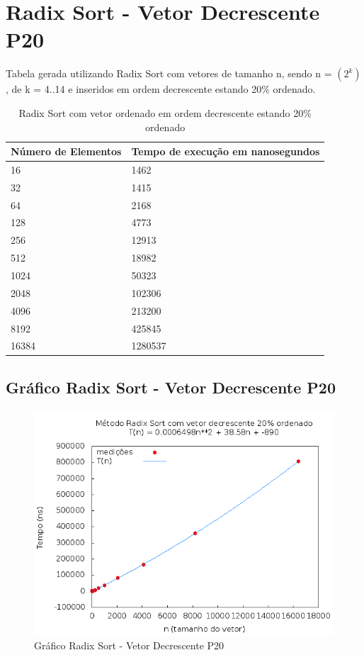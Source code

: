 \documentclass[12pt,a4paper,twoside]{report}
\begin{document}
\section{Radix Sort - Vetor Decrescente P20}
Tabela gerada utilizando Radix Sort com vetores de tamanho n, sendo n = $(2^k)$, de k = 4..14 e inseridos em ordem decrescente estando 20\% ordenado.
\begin{table}[H]
\centering
\caption{Radix Sort com vetor ordenado em ordem decrescente estando 20\% ordenado}
\label{my-label}
\begin{tabular}{|l|l|}
\hline
\multicolumn{1}{|c|}{\textbf{Número de Elementos}} & \multicolumn{1}{c|}{\textbf{Tempo de execução em nanosegundos}} \\ \hline
16 & 1462 \\ \hline
32 & 1415 \\ \hline
64 & 2168 \\ \hline
128 & 4773 \\ \hline
256 & 12913 \\ \hline
512 & 18982 \\ \hline
1024 & 50323 \\ \hline
2048 & 102306 \\ \hline
4096 & 213200 \\ \hline
8192 & 425845 \\ \hline
16384 & 1280537 \\ \hline
\end{tabular}
\end{table}

\subsection{Gráfico Radix Sort - Vetor Decrescente P20}
\begin{figure}[H]
    \centering
    \includegraphics[width=0.7\linewidth]{graficos/RadixSort/vIntDecrescenteP20/vIntDecrescenteP20.png}
  \caption{Gráfico Radix Sort - Vetor Decrescente P20}
\end{figure}
\end{document}
